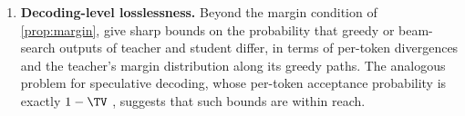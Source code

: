 \begin{enumerate}[leftmargin=*,label=\textbf{P\arabic*.}]
\item \textbf{Decoding-level losslessness.} Beyond the margin condition of \cref{prop:margin}, give sharp
bounds on the probability that greedy or beam-search outputs of teacher and student differ, in terms
of per-token divergences and the teacher's margin distribution along its greedy paths. The analogous
problem for speculative decoding, whose per-token acceptance probability is exactly $1-\TV$
\citep{leviathan2023fast}, suggests
that such bounds are within reach.
\end{enumerate}
